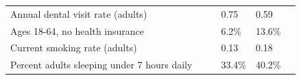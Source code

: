 \documentclass[9pt]{report}
\begin{document}
\begin{tabular}{p{.10in}p{.10in}p{.10in}p{3.7in}>{\hfill}p{.85in}>{\hfill}p{.85in}>{\hfill}p{.85in}>{\hfill}p{.85in}p{0.1in}}
\multicolumn{4}{l}{\parbox{3.6in}{\strut\raggedright{{Annual dental visit rate (adults)}}\strut}} &  &  & 0.75 & 0.59 & \multicolumn{1}{l}{}  \\ 
\multicolumn{4}{l}{\parbox{3.6in}{\strut\raggedright{{Ages 18-64, no health insurance}}\strut}} &  &  & 6.2\% & 13.6\% & \multicolumn{1}{l}{}  \\ 
\multicolumn{4}{l}{\parbox{3.6in}{\strut\raggedright{{Current smoking rate (adults)}}\strut}} &  &  & 0.13 & 0.18 & \multicolumn{1}{l}{}  \\ 
\multicolumn{4}{l}{\parbox{3.6in}{\strut\raggedright{{Percent adults sleeping under 7 hours daily}}\strut}} &  &  & 33.4\% & 40.2\% & \multicolumn{1}{l}{}  \\ 

\end{tabular}
\setlength{\tabcolsep}{6pt} %


\vspace{36pt}
\linespread{1.5}
\theendnotes
\end{document}
